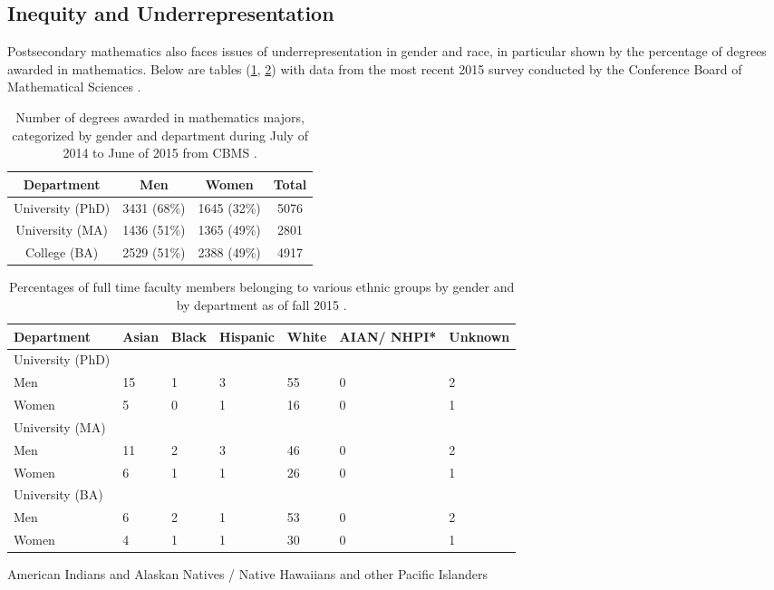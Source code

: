 \subsection{Inequity and Underrepresentation}
Postsecondary mathematics also faces issues of underrepresentation in gender and race, in particular shown by the percentage of degrees awarded in mathematics. Below are tables (\ref{table:gender}, \ref{table:race}) with data from the most recent 2015 survey conducted by the Conference Board of Mathematical Sciences \citep{blair_statistical_2018}.
\begin{table}[!htb]
  \begin{center}
    \begin{tabular}{c | c | c | c}
      Department & Men & Women & Total\\ \hline
      University (PhD) & 3431 (68\%) & 1645 (32\%) & 5076\\
      University (MA) & 1436 (51\%) & 1365 (49\%) & 2801\\
      College (BA) & 2529 (51\%) & 2388 (49\%) & 4917
    \end{tabular}
  \end{center}
  \caption{Number of degrees awarded in mathematics majors, categorized by gender and department during July of 2014 to June of 2015 from CBMS \citep{blair_statistical_2018}.}
  \label{table:gender}
\end{table}

\begin{table}[!htb]
  \begin{center}
    \begin{tabular}{l | l | l | l | l | p{1.2cm} | l}
      Department & Asian & Black & Hispanic & White & AIAN/ NHPI* & Unknown\\ \hline
      University (PhD)&&&&&\\
      Men & 15 & 1 & 3 & 55 & 0 & 2\\
      Women & 5 & 0 & 1 & 16 & 0 & 1\\ \hline
      University (MA)&&&&&\\
      Men & 11 & 2 & 3 & 46 & 0 & 2\\
      Women & 6 & 1 & 1 & 26 & 0 & 1\\ \hline
      University (BA)&&&&&\\
      Men & 6 & 2 & 1 & 53 & 0 & 2\\
      Women & 4 & 1 & 1 & 30 & 0 & 1
    \end{tabular}
  \end{center}
  {\footnotesize *American Indians and Alaskan Natives / Native Hawaiians and other Pacific Islanders}
  \caption{Percentages of full time faculty members belonging to various ethnic groups by gender and by department as of fall 2015 \citep{blair_statistical_2018}.}
  \label{table:race}
\end{table}

